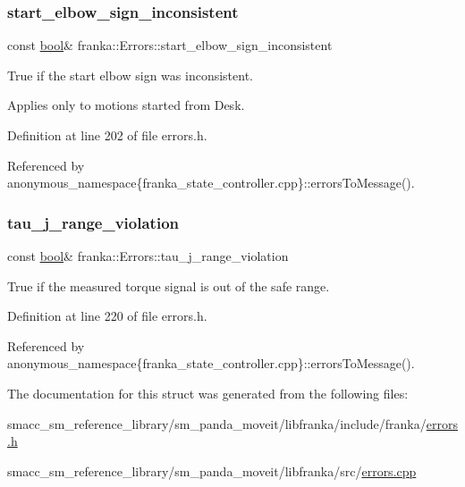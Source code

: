 \subsubsection{\texorpdfstring{start\+\_\+elbow\+\_\+sign\+\_\+inconsistent}{start\_elbow\_sign\_inconsistent}}
{\footnotesize\ttfamily const \hyperlink{classbool}{bool}\& franka\+::\+Errors\+::start\+\_\+elbow\+\_\+sign\+\_\+inconsistent}

True if the start elbow sign was inconsistent.

Applies only to motions started from Desk. 

Definition at line 202 of file errors.\+h.



Referenced by anonymous\+\_\+namespace\{franka\+\_\+state\+\_\+controller.\+cpp\}\+::errors\+To\+Message().

\mbox{\label{structfranka_1_1Errors_a1491f8428341649befa3d088aebb317e}} 
\subsubsection{\texorpdfstring{tau\+\_\+j\+\_\+range\+\_\+violation}{tau\_j\_range\_violation}}
{\footnotesize\ttfamily const \hyperlink{classbool}{bool}\& franka\+::\+Errors\+::tau\+\_\+j\+\_\+range\+\_\+violation}

True if the measured torque signal is out of the safe range. 

Definition at line 220 of file errors.\+h.



Referenced by anonymous\+\_\+namespace\{franka\+\_\+state\+\_\+controller.\+cpp\}\+::errors\+To\+Message().



The documentation for this struct was generated from the following files\+:\begin{DoxyCompactItemize}
\item 
smacc\+\_\+sm\+\_\+reference\+\_\+library/sm\+\_\+panda\+\_\+moveit/libfranka/include/franka/\hyperlink{errors_8h}{errors.\+h}\item 
smacc\+\_\+sm\+\_\+reference\+\_\+library/sm\+\_\+panda\+\_\+moveit/libfranka/src/\hyperlink{errors_8cpp}{errors.\+cpp}\end{DoxyCompactItemize}
